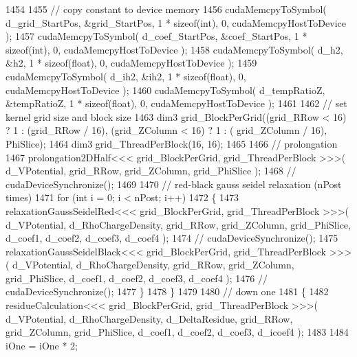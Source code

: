\begin{DoxyCode}
1454     
1455             \textcolor{comment}{// copy constant to device memory}
1456             cudaMemcpyToSymbol( d\_grid\_StartPos, &grid\_StartPos, 1 * \textcolor{keyword}{sizeof}(\textcolor{keywordtype}{int}), 0, cudaMemcpyHostToDevice
       );
1457             cudaMemcpyToSymbol( d\_coef\_StartPos, &coef\_StartPos, 1 * \textcolor{keyword}{sizeof}(\textcolor{keywordtype}{int}), 0, cudaMemcpyHostToDevice
       );
1458             cudaMemcpyToSymbol( d\_h2, &h2, 1 * \textcolor{keyword}{sizeof}(\textcolor{keywordtype}{float}), 0, cudaMemcpyHostToDevice );
1459             cudaMemcpyToSymbol( d\_ih2, &ih2, 1 * \textcolor{keyword}{sizeof}(\textcolor{keywordtype}{float}), 0, cudaMemcpyHostToDevice );
1460             cudaMemcpyToSymbol( d\_tempRatioZ, &tempRatioZ, 1 * \textcolor{keyword}{sizeof}(\textcolor{keywordtype}{float}), 0, cudaMemcpyHostToDevice );
1461 
1462             \textcolor{comment}{// set kernel grid size and block size}
1463             dim3 grid\_BlockPerGrid((grid\_RRow < 16) ? 1 : (grid\_RRow / 16), (grid\_ZColumn < 16) ? 1 : (
      grid\_ZColumn / 16), PhiSlice);
1464             dim3 grid\_ThreadPerBlock(16, 16);
1465     
1466         \textcolor{comment}{// prolongation}
1467             prolongation2DHalf<<< grid\_BlockPerGrid, grid\_ThreadPerBlock >>>( d\_VPotential, grid\_RRow, 
      grid\_ZColumn, grid\_PhiSlice );
1468 \textcolor{comment}{//          cudaDeviceSynchronize();}
1469 
1470             \textcolor{comment}{// red-black gauss seidel relaxation (nPost times)}
1471             \textcolor{keywordflow}{for} (\textcolor{keywordtype}{int} i = 0; i < nPost; i++)
1472             \{
1473                 relaxationGaussSeidelRed<<< grid\_BlockPerGrid, grid\_ThreadPerBlock >>>( d\_VPotential, 
      d\_RhoChargeDensity, grid\_RRow, grid\_ZColumn, grid\_PhiSlice, d\_coef1, d\_coef2, d\_coef3, d\_coef4 );
1474 \textcolor{comment}{//              cudaDeviceSynchronize();}
1475                 relaxationGaussSeidelBlack<<< grid\_BlockPerGrid, grid\_ThreadPerBlock >>>( d\_VPotential, 
      d\_RhoChargeDensity, grid\_RRow, grid\_ZColumn, grid\_PhiSlice, d\_coef1, d\_coef2, d\_coef3, d\_coef4 );
1476 \textcolor{comment}{//              cudaDeviceSynchronize();}
1477             \}
1478         \}
1479 
1480         \textcolor{comment}{// down one}
1481         \{
1482             residueCalculation<<< grid\_BlockPerGrid, grid\_ThreadPerBlock >>>( d\_VPotential, 
      d\_RhoChargeDensity, d\_DeltaResidue, grid\_RRow, grid\_ZColumn, grid\_PhiSlice, d\_coef1, d\_coef2, d\_coef3, d\_icoef4 );
1483                 
1484             iOne = iOne * 2; 

\end{DoxyCode}
